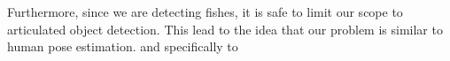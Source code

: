 Furthermore, since we are detecting fishes, it is safe to limit our scope to articulated
object detection. This lead to the idea that our problem is similar to human pose
estimation. and specifically to 





